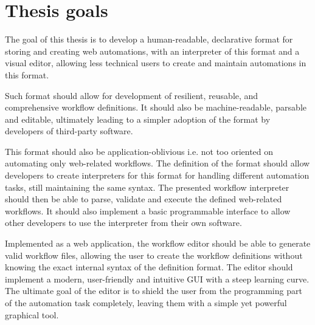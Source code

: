 \section*{Thesis goals}
The goal of this thesis is to develop a human-readable, declarative format for storing and creating web automations, with an interpreter of this format and a visual editor, allowing less technical users to create and maintain automations in this format.
\par
Such format should allow for development of resilient, reusable, and comprehensive workflow definitions. 
It should also be machine-readable, parsable and editable, ultimately leading to a simpler adoption of the format by developers of third-party software.
\par
This format should also be application-oblivious i.e. not too oriented on automating only web-related workflows.
The definition of the format should allow developers to create interpreters for this format for handling different automation tasks, still maintaining the same syntax.
The presented workflow interpreter should then be able to parse, validate and execute the defined web-related workflows. 
It should also implement a basic programmable interface to allow other developers to use the interpreter from their own software.
\par
Implemented as a web application, the workflow editor should be able to generate valid workflow files, allowing the user to create the workflow definitions without knowing the exact internal syntax of the definition format.
The editor should implement a modern, user-friendly and intuitive \ac{GUI} with a steep learning curve.
The ultimate goal of the editor is to shield the user from the programming part of the automation task completely, leaving them with a simple yet powerful graphical tool.